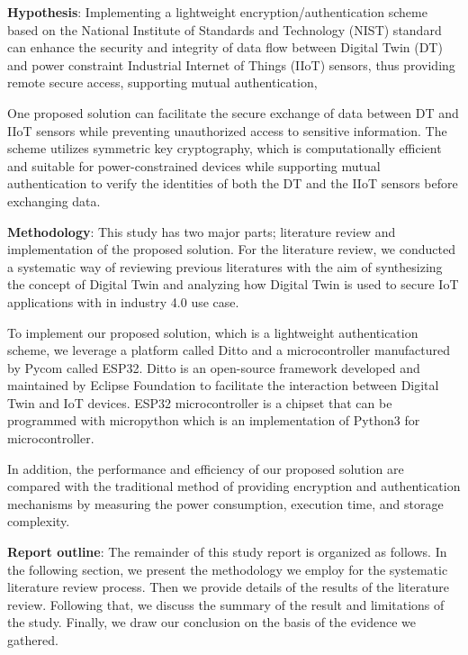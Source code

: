 \textbf{Hypothesis}:
Implementing a lightweight encryption/authentication scheme based on the National Institute of Standards and Technology (NIST) standard can enhance the security and integrity of data flow between Digital Twin (DT) and power constraint Industrial Internet of Things (IIoT) sensors, thus providing remote secure access, supporting mutual authentication,

One proposed solution  can facilitate the secure exchange of data between DT and IIoT sensors while preventing unauthorized access to sensitive information. The scheme utilizes symmetric key cryptography, which is computationally efficient and suitable for power-constrained devices while supporting mutual authentication to verify the identities of both the DT and the IIoT sensors before exchanging data.



\textbf{Methodology}:
This study has two major parts; literature review and implementation of the proposed solution. For the literature review, we conducted a systematic way of reviewing previous literatures with the aim of synthesizing the concept of Digital Twin and analyzing how Digital Twin is used to secure IoT applications with in industry 4.0 use case. 

To implement our proposed solution, which is a lightweight authentication scheme, we leverage a platform called Ditto and a microcontroller manufactured by Pycom called ESP32. Ditto is an open-source framework developed and maintained by Eclipse Foundation to facilitate the interaction between Digital Twin and IoT devices\cite{noauthor_eclipse_nodate}. ESP32 microcontroller is a chipset that can be programmed with micropython which is an implementation of Python3 for microcontroller. 

In addition, the performance and efficiency of our proposed solution are compared with the traditional  method of providing encryption and authentication mechanisms by measuring the power consumption, execution time, and storage complexity. 

%     
    

\textbf{Report outline}:
The remainder of this study report is organized as follows. In the following section, we present the methodology we employ for the systematic literature review process. Then we provide details of the results of the literature review. Following that, we discuss the summary of the result and limitations of the study. Finally, we draw our conclusion on the basis of the evidence we gathered.   

